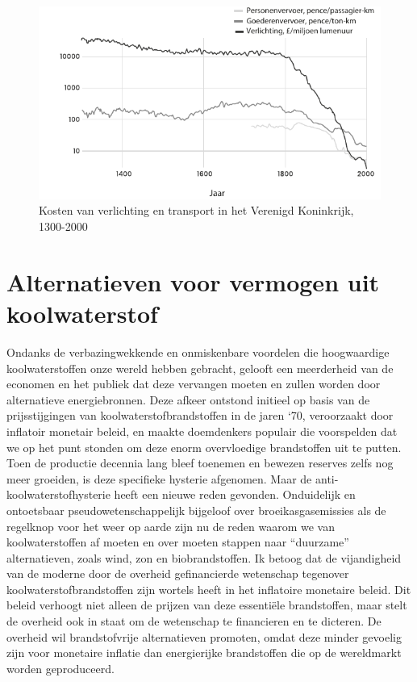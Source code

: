 \begin{figure}[!htb]
\centering
    \includegraphics[width=\textwidth]{figures/fig16.pdf}
    \caption[Kosten van verlichting en transport in het Verenigd Koninkrijk, 1300-2000]{Kosten van verlichting en transport in het Verenigd Koninkrijk, 1300-2000}
    \label{fig16}
\end{figure}


\hypertarget{alternatieven-voor-vermogen-uit-koolwaterstof}{%
\section{Alternatieven voor vermogen uit koolwaterstof}\label{alternatieven-voor-vermogen-uit-koolwaterstof}}

Ondanks de verbazingwekkende en onmiskenbare voordelen die hoogwaardige koolwaterstoffen onze wereld hebben gebracht, gelooft een meerderheid van de economen en het publiek dat deze vervangen moeten en zullen worden door alternatieve energiebronnen. Deze afkeer ontstond initieel op basis van de prijsstijgingen van koolwaterstofbrandstoffen in de jaren `70, veroorzaakt door inflatoir monetair beleid, en maakte doemdenkers populair die voorspelden dat we op het punt stonden om deze enorm overvloedige brandstoffen uit te putten. Toen de productie decennia lang bleef toenemen en bewezen reserves zelfs nog meer groeiden, is deze specifieke hysterie afgenomen. Maar de anti-koolwaterstofhysterie heeft een nieuwe reden gevonden. Onduidelijk en ontoetsbaar pseudowetenschappelijk bijgeloof over broeikasgasemissies als de regelknop voor het weer op aarde zijn nu de reden waarom we van koolwaterstoffen af moeten en over moeten stappen naar ``duurzame''  alternatieven, zoals wind, zon en biobrandstoffen. Ik betoog dat de vijandigheid van de moderne door de overheid gefinancierde wetenschap tegenover koolwaterstofbrandstoffen zijn wortels heeft in het inflatoire monetaire beleid. Dit beleid verhoogt niet alleen de prijzen van deze essentiële brandstoffen, maar stelt de overheid ook in staat om de wetenschap te financieren en te dicteren. De overheid wil brandstofvrije alternatieven promoten, omdat deze minder gevoelig zijn voor monetaire inflatie dan energierijke brandstoffen die op de wereldmarkt worden geproduceerd.


